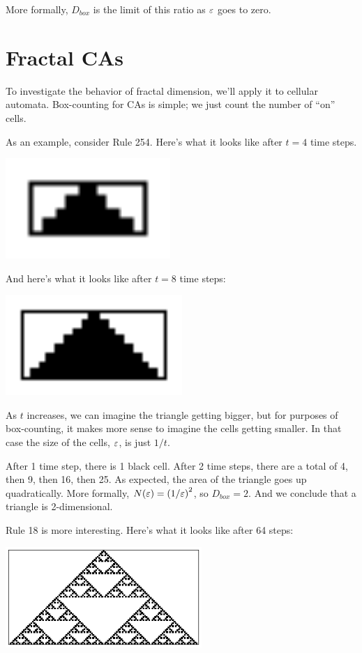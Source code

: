 \documentclass[10pt]{book}
\begin{document}
More formally, $D_{box}$ is the limit of this ratio as $\varepsilon$ goes
to zero.


\section{Fractal CAs}

To investigate the behavior of fractal dimension, we'll apply it
to cellular automata.  Box-counting for CAs is simple; we
just count the number of ``on'' cells.

As an example, consider Rule 254.  Here's what it looks like after
$t=4$ time steps.

\beforefig
\centerline{\includegraphics[height=1.5in]{figs/fractal254.4.eps}}
\afterfig

And here's what it looks like after $t=8$ time steps:

\beforefig
\centerline{\includegraphics[height=1.5in]{figs/fractal254.8.eps}}
\afterfig

As $t$ increases, we can imagine the triangle getting bigger, 
but for purposes of box-counting, it makes more sense to imagine
the cells getting smaller.  In that case the size of the cells,
$\varepsilon$, is just $1/t$.

After 1 time step, there is 1 black cell.  After 2 time steps, there
are a total of 4, then 9, then 16, then 25.  As expected, the area
of the triangle goes up quadratically.  More formally,
$N(\varepsilon) = \left( 1 / \varepsilon \right)^2$, so $D_{box} = 2$.  And we conclude
that a triangle is 2-dimensional.

Rule 18 is more interesting.  Here's what it looks like after 64 steps:

\beforefig
\centerline{\includegraphics[height=1.5in]{figs/rule18.eps}}
\afterfig
\end{document}
